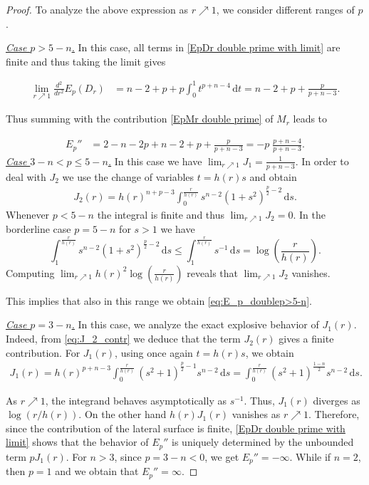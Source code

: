 \documentclass[10pt,a4paper]{amsart}
\newcommand{\dd}{\, \mathrm{d}}
\begin{document}
\begin{proof}
To analyze the above expression as $r \nearrow 1$, we consider different ranges of $p$.

\textit{\underline{Case $p>5-n$.}} 
In this case, all terms in \eqref{EpDr double prime with limit} are finite and thus taking the limit gives

     \begin{align*}
  \lim_{r\nearrow 1} \frac{d^2}{dr^2}E_p(D_r) &=   n-2 + p+p  \int_0^{1} t^{p+n-4} \dd t=  n-2+p + \frac{p}{p+n-3}.
 \end{align*}

Thus summing with the contribution \eqref{EpMr double prime} of $M_r$ leads to 

\begin{align}\label{eq:E_p_doublep>5-n}
    E_p'' &=   2-n-2p +   n-2+p + \frac{p}{p+n-3} =-p \; \frac{p+n-4}{p+n-3}.
\end{align}
\textit{\underline{Case $3-n<p\leq 5-n$.}}  
In this case we have $\lim_{r\nearrow 1}J_1=\frac{1}{p+n-3}$. In order to deal with $J_2$ we use the change of variables $t=h(r)s$ and obtain
\begin{align}\label{eq:J_2_contr}
    J_2(r)=h(r)^{n+p-3} \int_0^{\frac{r}{h(r)}} s^{n-2} (1+s^2)^{\frac{p}{2}-2} \dd s.
\end{align}
Whenever $p <5-n$ the integral is finite and thus $\lim_{r \nearrow 1} J_2=0$. In the borderline case $p=5-n$ for $s>1$ we have
\[
\int_{1}^{\frac{r}{h(r)}} s^{n-2} (1+s^2)^{\frac{p}{2}-2} \dd s \leq \int_{1}^{\frac{r}{h(r)}} s^{-1} \dd s  = \log \left( \frac{r}{h(r)}\right).
\]
 Computing $\lim_{r \nearrow 1} h(r)^2  \log \left( \frac{r}{h(r)}\right)$ reveals that $\lim_{r \nearrow 1} J_2$ vanishes.
 
 This implies that also in this range we obtain \eqref{eq:E_p_doublep>5-n}.



\smallskip  
\textit{\underline{Case $p=3-n$.}}
In this case, we analyze the exact explosive behavior of $J_1(r)$. Indeed, from \eqref{eq:J_2_contr} we deduce that the term $J_2(r)$ gives a finite contribution. For $J_1(r)$, using once again $t=h(r)s$, we obtain
\begin{align} \label{eq:J_1}
    J_1(r) = h(r)^{p+n-3} \int_0^{\frac{r}{h(r)}} (s^2+1)^{\frac{p}{2}-1} s^{n-2} \dd s = \int_0^{\frac{r}{h(r)}} (s^2+1)^{\frac{1-n}{2}} s^{n-2} \dd s.
\end{align}

As $r\nearrow 1$, the integrand behaves asymptotically as $s^{-1}$. Thus, $J_1(r)$ diverges  as $\log(r/h(r))$.
On the other hand $h(r)J_1(r)$ vanishes as $r \nearrow 1$.
Therefore, since the contribution of the lateral surface is finite, \eqref{EpDr double prime with limit} shows that the behavior of $E_p''$ is uniquely determined by the unbounded term $p J_1(r)$.
For $n>3$, since $p=3-n<0$, we get $E_p''=-\infty$.
While if $n = 2$, then $p = 1$ and we obtain that $E_p'' = \infty$.



\end{proof}
\end{document}
